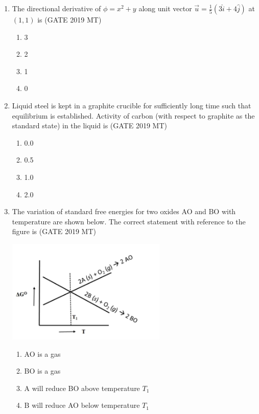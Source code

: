 \documentclass[12pt]{article}
\begin{document}
\begin{enumerate}
\item The directional derivative of $\phi = x^2 + y$ along unit vector $\vec{u} = \frac{1}{5}(3\hat{i} + 4\hat{j})$ at $(1,1)$ is \hspace{1em} (GATE 2019 MT)
\begin{enumerate}[label=(\alph*)]
    \item 3
    \item 2
    \item 1
    \item 0
\end{enumerate}

\item Liquid steel is kept in a graphite crucible for sufficiently long time such that equilibrium is established. Activity of carbon (with respect to graphite as the standard state) in the liquid is \hspace{1em} (GATE 2019 MT)
\begin{enumerate}[label=(\alph*)]
    \item 0.0
    \item 0.5
    \item 1.0
    \item 2.0
\end{enumerate}

\item The variation of standard free energies for two oxides AO and BO with temperature are shown below. The correct statement with reference to the figure is \hspace{1em} (GATE 2019 MT)
\begin{center}
    \includegraphics[width=0.6\textwidth]{images/qq6i.jpg}
\end{center}
\begin{enumerate}[label=(\alph*)]
    \item AO is a gas
    \item BO is a gas
    \item A will reduce BO above temperature $T_1$
    \item B will reduce AO below temperature $T_1$
\end{enumerate}


\end{enumerate}
\end{document}
